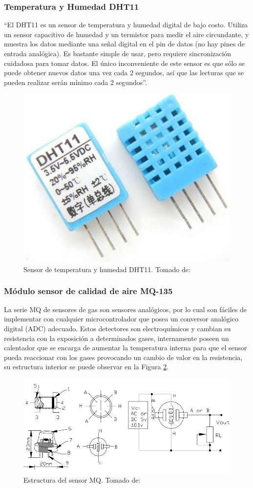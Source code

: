\subsubsection{Temperatura y Humedad DHT11}

``El DHT11 es un sensor de temperatura y humedad digital de bajo costo. Utiliza un sensor capacitivo de humedad y un termistor para medir el aire circundante, y muestra los datos mediante una señal digital en el pin de datos (no hay pines de entrada analógica). Es bastante simple de usar, pero requiere sincronización cuidadosa para tomar datos. El único inconveniente de este sensor es que sólo se puede obtener nuevos datos una vez cada 2 segundos, así que las lecturas que se pueden realizar serán mínimo cada 2 segundos''. \cite{DHT11}

\begin{figure}[H]
	\centering
	\caption[Sensor de temperatura y humedad DHT11.]{Sensor de temperatura y humedad DHT11. Tomado de: \cite{DHT11}}
	\label{fig:dht11}
	\includegraphics[width=0.4\linewidth]{Imagenes/dht11}
\end{figure}


\subsubsection{Módulo sensor de calidad de aire MQ-135}

La serie MQ de sensores de gas son sensores analógicos, por lo cual son fáciles de implementar con cualquier microcontrolador que posea un conversor analógico digital (ADC) adecuado. Estos detectores son electroquímicos y cambian su resistencia con la exposición a determinados gases, internamente poseen un calentador que se encarga de aumentar la temperatura interna para que el sensor pueda reaccionar con los gases provocando un cambio de valor en la resistencia, su estructura interior se puede observar en la Figura \ref{fig:estructura-del-sensor-mq}.\cite{MQ1}

\begin{figure}[H]
	\centering
	\caption[Estructura del sensor MQ.]{Estructura del sensor MQ. Tomado de: \cite{MQ1}}
	\label{fig:estructura-del-sensor-mq}
	\includegraphics[width=0.7\linewidth]{Imagenes/Estructura_del_sensor_MQ}
\end{figure}

